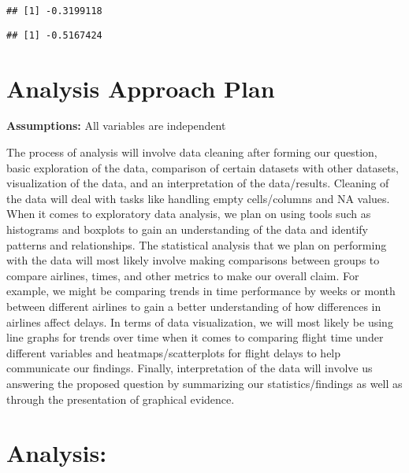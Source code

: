 \documentclass[
]{article}
\newenvironment{Shaded}{\begin{snugshade}}{\end{snugshade}}
\newcommand{\AttributeTok}[1]{\textcolor[rgb]{0.13,0.29,0.53}{#1}}
\newcommand{\FunctionTok}[1]{\textcolor[rgb]{0.13,0.29,0.53}{\textbf{#1}}}
\newcommand{\NormalTok}[1]{#1}
\newcommand{\SpecialCharTok}[1]{\textcolor[rgb]{0.81,0.36,0.00}{\textbf{#1}}}
\newcommand{\StringTok}[1]{\textcolor[rgb]{0.31,0.60,0.02}{#1}}
\begin{document}
\begin{verbatim}
## [1] -0.3199118
\end{verbatim}

\begin{Shaded}
\end{Shaded}

\begin{verbatim}
## [1] -0.5167424
\end{verbatim}

\newpage

\section{Analysis Approach Plan}\label{analysis-approach-plan}

\textbf{Assumptions:} All variables are independent

The process of analysis will involve data cleaning after forming our
question, basic exploration of the data, comparison of certain datasets
with other datasets, visualization of the data, and an interpretation of
the data/results. Cleaning of the data will deal with tasks like
handling empty cells/columns and NA values. When it comes to exploratory
data analysis, we plan on using tools such as histograms and boxplots to
gain an understanding of the data and identify patterns and
relationships. The statistical analysis that we plan on performing with
the data will most likely involve making comparisons between groups to
compare airlines, times, and other metrics to make our overall claim.
For example, we might be comparing trends in time performance by weeks
or month between different airlines to gain a better understanding of
how differences in airlines affect delays. In terms of data
visualization, we will most likely be using line graphs for trends over
time when it comes to comparing flight time under different variables
and heatmaps/scatterplots for flight delays to help communicate our
findings. Finally, interpretation of the data will involve us answering
the proposed question by summarizing our statistics/findings as well as
through the presentation of graphical evidence.

\section{Analysis:}\label{analysis}
\end{document}

